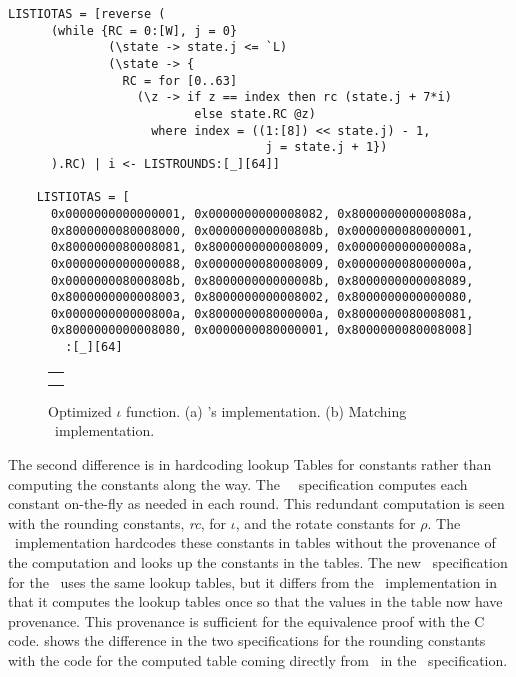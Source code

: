 \newsavebox{\cryciota}
\begin{lrbox}{\cryciota}
  \begin{lstlisting}[language=Cryptol]
    LISTIOTAS = [reverse (
      (while {RC = 0:[W], j = 0} 
              (\state -> state.j <= `L) 
              (\state -> { 
                RC = for [0..63] 
                  (\z -> if z == index then rc (state.j + 7*i)
                          else state.RC @z)
                    where index = ((1:[8]) << state.j) - 1,
                                    j = state.j + 1})
      ).RC) | i <- LISTROUNDS:[_][64]]

    LISTIOTAS = [
      0x0000000000000001, 0x0000000000008082, 0x800000000000808a,
      0x8000000080008000, 0x000000000000808b, 0x0000000080000001,
      0x8000000080008081, 0x8000000000008009, 0x000000000000008a,
      0x0000000000000088, 0x0000000080008009, 0x000000008000000a,
      0x000000008000808b, 0x800000000000008b, 0x8000000000008089,
      0x8000000000008003, 0x8000000000008002, 0x8000000000000080,
      0x000000000000800a, 0x800000008000000a, 0x8000000080008081,
      0x8000000000008080, 0x0000000080000001, 0x8000000080008008]
        :[_][64]
  \end{lstlisting}    
\end{lrbox}

\begin{figure}[t]
  \begin{center}
    \begin{tabular}{l}
      \usebox{\cryciota} \\ \\
    \end{tabular}
  \end{center}
  \caption{Optimized $\iota$ function. (a) \openssl's implementation. (b) Matching \cryptol\ implementation.}
  \label{fig:iota}
\end{figure}

The second difference is in hardcoding lookup Tables for constants rather than computing the constants along the way.
The \fips\ \cryptol\ specification computes each constant on-the-fly as needed in each round.
This redundant computation is seen with the rounding constants, \emph{rc}, for $\iota$, and the rotate constants for $\rho$. 
The \openssl\ implementation hardcodes these constants in tables without the provenance of the computation and looks up the constants in the tables.
The new \cryptol\ specification for the \openssl\ uses the same lookup tables, but it differs from the \openssl\ implementation in that it computes the lookup tables once so that the values in the table now have provenance.
This provenance is sufficient for the equivalence proof with the C code.
 shows the difference in the two specifications for the rounding constants with the code for the computed table coming directly from \fips\ in the \openssl\ specification.